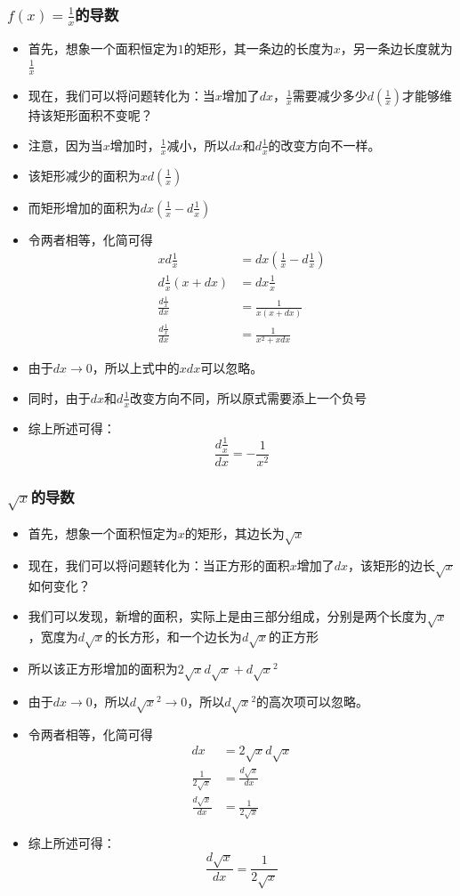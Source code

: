 \documentclass[UTF8]{ctexart}
\begin{document}
\subsubsection{$f(x) = \frac{1}{x}$的导数}
\begin{itemize}
	\item 首先，想象一个面积恒定为$1$的矩形，其一条边的长度为$x$，另一条边长度就为$\frac{1}{x}$
	\item 现在，我们可以将问题转化为：当$x$增加了$dx$，$\frac{1}{x}$需要减少多少$d(\frac{1}{x})$才能够维持该矩形面积不变呢？
	\item 注意，因为当$x$增加时，$\frac{1}{x}$减小，所以$dx$和$d\frac{1}{x}$的改变方向不一样。
	\item 该矩形减少的面积为$xd(\frac{1}{x})$
	\item 而矩形增加的面积为$dx(\frac{1}{x} - d\frac{1}{x})$
	\item 令两者相等，化简可得 \begin{align*}
		xd\frac{1}{x} &= dx(\frac{1}{x} - d\frac{1}{x}) \\
		d\frac{1}{x}(x+dx) &= dx\frac{1}{x} \\
		\frac{d\frac{1}{x}}{dx} &= \frac{1}{x(x+dx)} \\ 
		\frac{d\frac{1}{x}}{dx} &= \frac{1}{x^2+xdx}
	\end{align*}
	\item 由于$dx\to0$，所以上式中的$xdx$可以忽略。
	\item 同时，由于$dx$和$d\frac{1}{x}$改变方向不同，所以原式需要添上一个负号
	\item 综上所述可得：$$\frac{d\frac{1}{x}}{dx} = -\frac{1}{x^2}$$
\end{itemize}

\subsubsection{$\sqrt{x}$的导数}
\begin{itemize}
	\item 首先，想象一个面积恒定为$x$的矩形，其边长为$\sqrt{x}$
	\item 现在，我们可以将问题转化为：当正方形的面积$x$增加了$dx$，该矩形的边长$\sqrt{x}$如何变化？
	\item 我们可以发现，新增的面积，实际上是由三部分组成，分别是两个长度为$\sqrt{x}$，宽度为$d\sqrt{x}$的长方形，和一个边长为$d\sqrt{x}$的正方形
	\item 所以该正方形增加的面积为$2\sqrt{x}d\sqrt{x} + d\sqrt{x}^2$
	\item 由于$dx\to0$，所以$d\sqrt{x}^2\to0$，所以$d\sqrt{x}^2$的高次项可以忽略。
	\item 令两者相等，化简可得 \begin{align*}
		dx &= 2\sqrt{x}d\sqrt{x} \\
		\frac{1}{2\sqrt{x}} & = \frac{d\sqrt{x}}{dx} \\
		\frac{d\sqrt{x}}{dx} & = \frac{1}{2\sqrt{x}}
	\end{align*}
	\item 综上所述可得：$$\frac{d\sqrt{x}}{dx} = \frac{1}{2\sqrt{x}}$$
\end{itemize}
\end{document}
